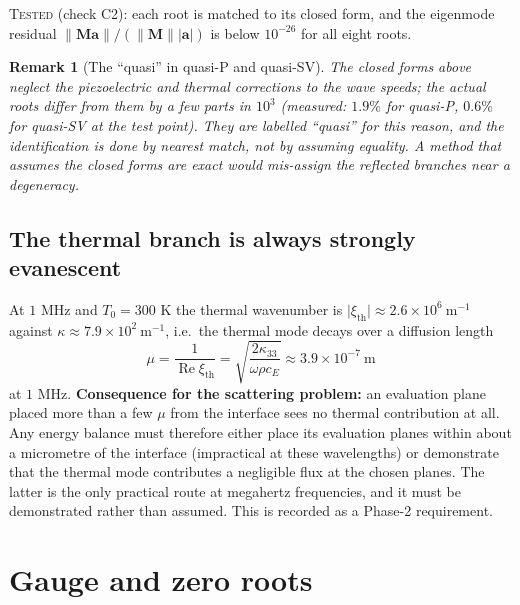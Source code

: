 \documentclass[11pt]{article}
\theoremstyle{plain}
\newtheorem{remark}{Remark}
\begin{document}
\textsc{Tested} (check C2): each root is matched to its closed form, and the
eigenmode residual $\lVert\bm{M}\bm{a}\rVert/(\lVert\bm{M}\rVert\lvert\bm{a}\rvert)$
is below $10^{-26}$ for all eight roots.

\begin{remark}[The ``quasi'' in quasi-P and quasi-SV]
\label{rem:quasi}
The closed forms above neglect the piezoelectric and thermal corrections to the
wave speeds; the actual roots differ from them by a few parts in $10^{3}$
(measured: $1.9\%$ for quasi-P, $0.6\%$ for quasi-SV at the test point). They are
labelled ``quasi'' for this reason, and the identification is done by nearest
match, not by assuming equality. A method that assumes the closed forms are exact
would mis-assign the reflected branches near a degeneracy.
\end{remark}

\subsection{The thermal branch is always strongly evanescent}

At $1$ MHz and $T_0=300$ K the thermal wavenumber is
$\lvert\xi_{\mathrm{th}}\rvert \approx 2.6\times10^{6}\ \mathrm{m^{-1}}$ against
$\kappa\approx 7.9\times10^{2}\ \mathrm{m^{-1}}$, i.e.\ the thermal mode decays
over a diffusion length
\begin{equation}
  \mu = \frac{1}{\operatorname{Re}\xi_{\mathrm{th}}}
  = \sqrt{\frac{2\kappa_{33}}{\omega\rho c_E}} \approx 3.9\times10^{-7}\ \mathrm{m}
  \label{eq:mu}
\end{equation}
at $1$ MHz. \textbf{Consequence for the scattering problem:} an evaluation plane
placed more than a few $\mu$ from the interface sees no thermal contribution at
all. Any energy balance must therefore either place its evaluation planes within
about a micrometre of the interface (impractical at these wavelengths) or
demonstrate that the thermal mode contributes a negligible flux at the chosen
planes. The latter is the only practical route at megahertz frequencies, and it
must be demonstrated rather than assumed. This is recorded as a Phase-2
requirement.

\section{Gauge and zero roots}
\label{sec:gauge}
\end{document}

